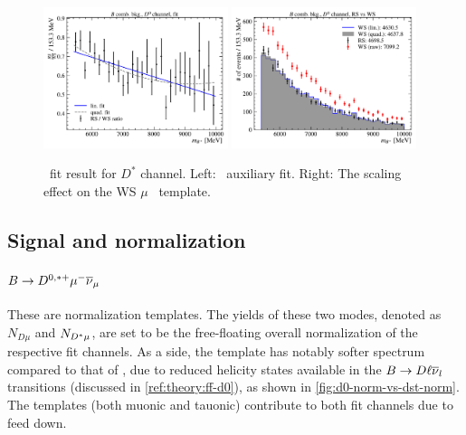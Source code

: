 \begin{figure}[!htb]
    \centering
    \includegraphics[width=0.48\textwidth]{figs-fit-fit-templates/data-driven-plots/b_comb/fit_b_comb_d0_fit.pdf}
    \includegraphics[width=0.48\textwidth]{figs-fit-fit-templates/data-driven-plots/b_comb/fit_b_comb_d0_scaled.pdf}

    \caption{
        \BComb\ fit result for $D^*$ channel.
        Left: \BComb\ auxiliary fit.
        Right: The scaling effect on the WS $\mu$ \BComb\ template.
    }
    \label{fig:b-comb-d0}
\end{figure}


\subsection{Signal and normalization}
\label{tmpl:sig-norm}

\paragraph{$B \rightarrow D^{0,*+}{\mu^-}{{\overline{\nu}}_\mu}$}
These are normalization templates.
The yields of these two modes, denoted as $N_{D\mu}$ and $N_{{{D}^*}\mu}$,
are set to be the free-floating overall normalization of the respective
fit channels.
As a side, the \Dz\muon template has notably softer \qSq spectrum compared to
that of \Dstar\muon, due to reduced helicity states available in the
$B \rightarrow D \ell {\ensuremath{{\overline{\nu}}_l}}$ transitions
(discussed in \cref{ref:theory:ff-d0}),
as shown in \cref{fig:d0-norm-vs-dst-norm}.
The \Dstarp templates (both muonic and tauonic) contribute to both fit channels
due to feed down.

